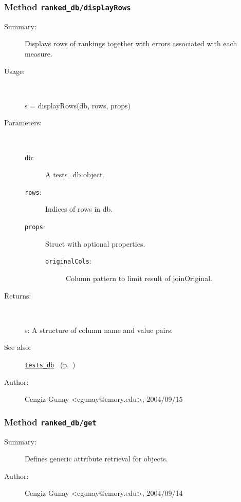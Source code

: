 \subsubsection[Method \texttt{displayRows}]{Method \texttt{ranked\_db/displayRows}}%
%
\label{ref_ranked_db__displayRows}%
\hypertarget{ref_ranked_db__displayRows}{}%
\begin{description}
\item[Summary:]Displays rows of rankings together with errors associated with each measure.
%
\item[Usage:]~%
\begin{lyxcode}%
s = displayRows(db, rows, props)
%
\end{lyxcode}%
%
%
\item[Parameters:]~
\begin{description}%
\item[\texttt{db}:]
 A tests\_db object.
\item[\texttt{rows}:]
 Indices of rows in db.
\item[\texttt{props}:]
 Struct with optional properties.
\begin{description}%
\item[\texttt{originalCols}:]
 Column pattern to limit result of joinOriginal.
\end{description}%
\end{description}%
%
\item[Returns:
]~

   s: A structure of column name and value pairs.
%
%
\item[See also:]%
\hyperlink{ref_tests_db}{\texttt{tests\_db}}%
\ (p.~\pageref{ref_tests_db})%
%
%
\item[Author:]%
Cengiz Gunay <cgunay@emory.edu>, 2004/09/15
%
\end{description}
\methodline%
\subsubsection[Method \texttt{get}]{Method \texttt{ranked\_db/get}}%
%
\label{ref_ranked_db__get}%
\hypertarget{ref_ranked_db__get}{}%
\begin{description}
\item[Summary:]Defines generic attribute retrieval for objects.
%
%
%
%
%
%
%
\item[Author:]%
Cengiz Gunay <cgunay@emory.edu>, 2004/09/14
%
\end{description}
\methodline%
